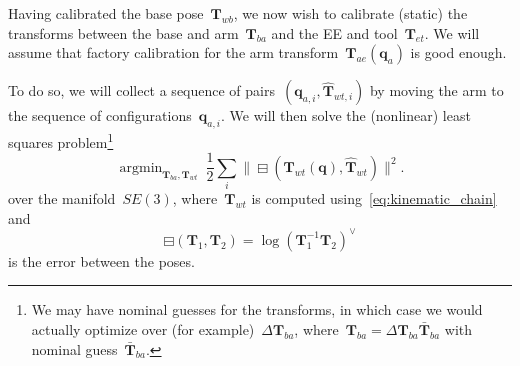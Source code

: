 \documentclass{article}
\DeclareMathOperator*{\argmin}{argmin}
\begin{document}
Having calibrated the base pose~$\bm{T}_{wb}$, we now wish to calibrate
(static) the transforms between the base and arm~$\bm{T}_{ba}$ and the EE and
tool~$\bm{T}_{et}$. We will assume that factory calibration for the arm
transform~$\bm{T}_{ae}(\bm{q}_a)$ is good enough.

To do so, we will collect a sequence of
pairs~$(\bm{q}_{a,i},\hat{\bm{T}}_{wt,i})$ by moving the arm to the sequence of
configurations~$\bm{q}_{a,i}$. We will then solve the (nonlinear) least squares
problem\footnote{We may have nominal guesses for the transforms, in which case
we would actually optimize over (for example)~$\Delta\bm{T}_{ba}$,
where~$\bm{T}_{ba}=\Delta\bm{T}_{ba}\bar{\bm{T}}_{ba}$ with nominal
guess~$\bar{\bm{T}}_{ba}$.}
\begin{equation}
  \argmin_{\bm{T}_{ba},\bm{T}_{wt}}\ \frac{1}{2}\sum_i\|\boxminus(\bm{T}_{wt}(\bm{q}),\hat{\bm{T}}_{wt})\|^2.
\end{equation}
over the manifold~$SE(3)$, where~$\bm{T}_{wt}$ is computed using~\eqref{eq:kinematic_chain} and
\begin{equation}
  \boxminus(\bm{T}_1,\bm{T}_2) = \log(\bm{T}_1^{-1}\bm{T}_2)^\vee
\end{equation}
is the error between the poses.
\end{document}
